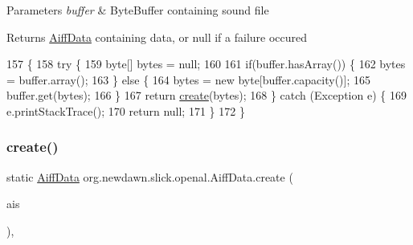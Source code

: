 \begin{DoxyParams}{Parameters}
{\em buffer} & Byte\+Buffer containing sound file \\
\hline
\end{DoxyParams}
\begin{DoxyReturn}{Returns}
\mbox{\hyperlink{classorg_1_1newdawn_1_1slick_1_1openal_1_1_aiff_data}{Aiff\+Data}} containing data, or null if a failure occured 
\end{DoxyReturn}

\begin{DoxyCode}
157                                                      \{
158         \textcolor{keywordflow}{try} \{
159             byte[] bytes = null;
160             
161             \textcolor{keywordflow}{if}(buffer.hasArray()) \{
162                 bytes = buffer.array();
163             \} \textcolor{keywordflow}{else} \{
164                 bytes = \textcolor{keyword}{new} byte[buffer.capacity()];
165                 buffer.get(bytes);
166             \}
167             \textcolor{keywordflow}{return} \mbox{\hyperlink{classorg_1_1newdawn_1_1slick_1_1openal_1_1_aiff_data_a0ebd8831d179c446e18751819f9045c5}{create}}(bytes);
168         \} \textcolor{keywordflow}{catch} (Exception e) \{
169             e.printStackTrace();
170             \textcolor{keywordflow}{return} null;
171         \}
172     \}   
\end{DoxyCode}
\mbox{\label{classorg_1_1newdawn_1_1slick_1_1openal_1_1_aiff_data_a84f2be2ea444abb6758bc7833b1a5c02}} 
\subsubsection{\texorpdfstring{create()}{create()}\hspace{0.1cm}{\footnotesize\ttfamily [6/6]}}
{\footnotesize\ttfamily static \mbox{\hyperlink{classorg_1_1newdawn_1_1slick_1_1openal_1_1_aiff_data}{Aiff\+Data}} org.\+newdawn.\+slick.\+openal.\+Aiff\+Data.\+create (\begin{DoxyParamCaption}\item[{\mbox{\hyperlink{interfaceorg_1_1newdawn_1_1slick_1_1openal_1_1_audio_input_stream}{Audio\+Input\+Stream}}}]{ais }\end{DoxyParamCaption})\hspace{0.3cm}{\ttfamily [inline]}, {\ttfamily [static]}}

